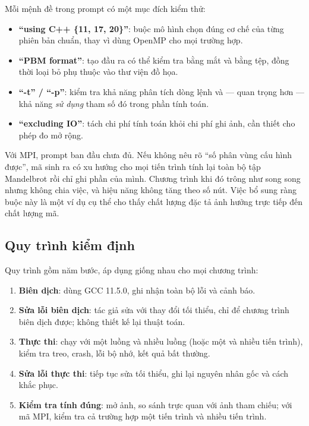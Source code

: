 Mỗi mệnh đề trong prompt có một mục đích kiểm thử:

\begin{itemize}
  \item \textbf{“using C++ \{11, 17, 20\}”}: buộc mô hình chọn đúng cơ chế của
        từng phiên bản chuẩn, thay vì dùng OpenMP cho mọi trường hợp.
  \item \textbf{“PBM format”}: tạo đầu ra có thể kiểm tra bằng mắt và bằng tệp,
        đồng thời loại bỏ phụ thuộc vào thư viện đồ họa.
  \item \textbf{“-t” / “-p”}: kiểm tra khả năng phân tích dòng lệnh và — quan
        trọng hơn — khả năng \emph{sử dụng} tham số đó trong phần tính toán.
  \item \textbf{“excluding IO”}: tách chi phí tính toán khỏi chi phí ghi ảnh, cần
        thiết cho phép đo mở rộng.
\end{itemize}

Với MPI, prompt ban đầu chưa đủ. Nếu không nêu rõ “số phân vùng cấu hình được”,
mã sinh ra có xu hướng cho mọi tiến trình tính lại toàn bộ tập Mandelbrot rồi
chỉ ghi phần của mình. Chương trình khi đó trông như song song nhưng không chia
việc, và hiệu năng không tăng theo số nút. Việc bổ sung ràng buộc này là một ví
dụ cụ thể cho thấy chất lượng đặc tả ảnh hưởng trực tiếp đến chất lượng mã.

\subsection{Quy trình kiểm định}

Quy trình gồm năm bước, áp dụng giống nhau cho mọi chương trình:

\begin{enumerate}
  \item \textbf{Biên dịch}: dùng GCC 11.5.0, ghi nhận toàn bộ lỗi và cảnh báo.
  \item \textbf{Sửa lỗi biên dịch}: tác giả sửa với thay đổi tối thiểu, chỉ để
        chương trình biên dịch được; không thiết kế lại thuật toán.
  \item \textbf{Thực thi}: chạy với một luồng và nhiều luồng (hoặc một và nhiều
        tiến trình), kiểm tra treo, crash, lỗi bộ nhớ, kết quả bất thường.
  \item \textbf{Sửa lỗi thực thi}: tiếp tục sửa tối thiểu, ghi lại nguyên nhân
        gốc và cách khắc phục.
  \item \textbf{Kiểm tra tính đúng}: mở ảnh, so sánh trực quan với ảnh tham
        chiếu; với mã MPI, kiểm tra cả trường hợp một tiến trình và nhiều tiến
        trình.
\end{enumerate}

